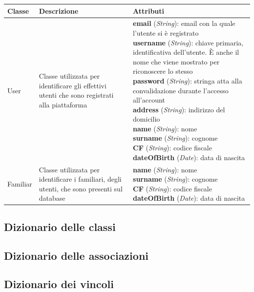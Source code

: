 \begin{table}[!h]

    \centering

    \begin{tabular}{m{2cm}|m{4cm}|m{7.7cm}}

         \rowcolor{black!10}Classe & Descrizione & Attributi\\ \hline

         User & Classe utilizzata per identificare gli effettivi utenti che sono registrati alla piattaforma &
         \parbox{7.7cm}{\textbf{email} (\textit{String}): email con la quale l'utente si è registrato \\ 
         \textbf{username} (\textit{String}): chiave primaria, identificativa dell'utente. È anche il nome che viene mostrato per riconoscere lo stesso \\
         \textbf{password} (\textit{String}): stringa atta alla convalidazione durante l'accesso all'account \\
         \textbf{address} (\textit{String}): indirizzo del domicilio \\
         \textbf{name} (\textit{String}): nome \\
         \textbf{surname} (\textit{String}): cognome \\
         \textbf{CF} (\textit{String}): codice fiscale \\
         \textbf{dateOfBirth} (\textit{Date}): data di nascita} \\ \hline

         Familiar & Classe utilizzata per identificare i familiari, degli utenti, che sono presenti sul database &
         \parbox{7.7cm}{\textbf{name} (\textit{String}): nome \\
         \textbf{surname} (\textit{String}): cognome \\
         \textbf{CF} (\textit{String}): codice fiscale \\
         \textbf{dateOfBirth} (\textit{Date}): data di nascita} \\ \hline
    
        \end{tabular}

\end{table}

\subsection{Dizionario delle classi}

\subsection{Dizionario delle associazioni}

\subsection{Dizionario dei vincoli}
